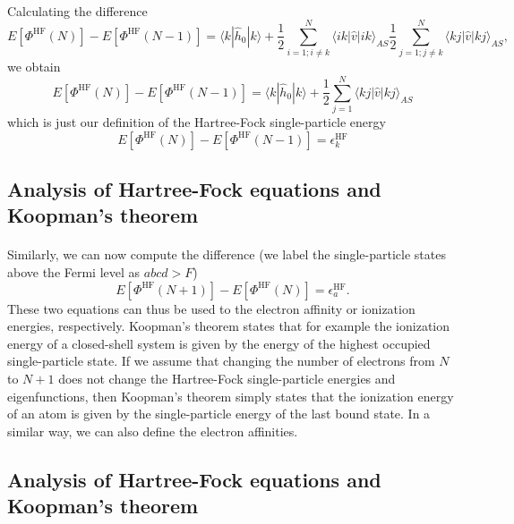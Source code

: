 \documentclass[%
twoside,                 %
final,                   %
10pt]{article}
\begin{document}
\paragraph{}
Calculating the difference 
\[
  E[\Phi^{\mathrm{HF}}(N)]-   E[\Phi^{\mathrm{HF}}(N-1)] = \langle k | \hat{h}_0 | k \rangle +
  \frac{1}{2}\sum_{i=1;i\ne k}^N\langle ik|\hat{v}|ik\rangle_{AS}  \frac{1}{2}\sum_{j=1;j\ne k}^N\langle kj|\hat{v}|kj\rangle_{AS},
\]
we obtain
\[
  E[\Phi^{\mathrm{HF}}(N)]-   E[\Phi^{\mathrm{HF}}(N-1)] = \langle k | \hat{h}_0 | k \rangle +
  \frac{1}{2}\sum_{j=1}^N\langle kj|\hat{v}|kj\rangle_{AS}
\]
which is just our definition of the Hartree-Fock single-particle energy
\[
  E[\Phi^{\mathrm{HF}}(N)]-   E[\Phi^{\mathrm{HF}}(N-1)] = \epsilon_k^{\mathrm{HF}} 
\]



\subsection*{Analysis of Hartree-Fock equations and Koopman's theorem}

\paragraph{}
Similarly, we can now compute the difference (we label the single-particle states above the Fermi level as $abcd > F$)
\[
  E[\Phi^{\mathrm{HF}}(N+1)]-   E[\Phi^{\mathrm{HF}}(N)]= \epsilon_a^{\mathrm{HF}}. 
\]
These two equations can thus be used to the electron affinity or ionization energies, respectively. 
Koopman's theorem states that for example the ionization energy of a closed-shell system is given by the energy of the highest occupied single-particle state.  If we assume that changing the number of electrons from $N$ to $N+1$ does not change the Hartree-Fock single-particle energies and eigenfunctions, then Koopman's theorem simply states that the ionization energy of an atom is given by the single-particle energy of the last bound state. In a similar way, we can also define the electron affinities.



\subsection*{Analysis of Hartree-Fock equations and Koopman's theorem}
\end{document}
